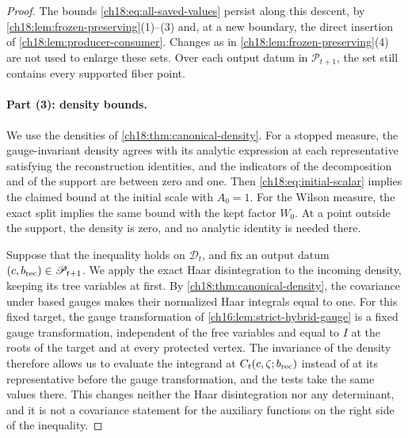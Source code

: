 \begin{proof}
The bounds \eqref{ch18:eq:all-saved-values} persist along this descent, by \cref{ch18:lem:frozen-preserving}(1)--(3) and, at a new boundary, the direct insertion of \cref{ch18:lem:producer-consumer}. Changes as in \cref{ch18:lem:frozen-preserving}(4) are not used to enlarge these sets. Over each output datum in $\mathscr P_{t+1}$, the set still contains every supported fiber point.

\paragraph{Part (3): density bounds.}
We use the densities of \cref{ch18:thm:canonical-density}. For a stopped measure, the gauge-invariant density agrees with its analytic expression at each representative satisfying the reconstruction identities, and the indicators of the decomposition and of the support are between zero and one. Then \eqref{ch18:eq:initial-scalar} implies the claimed bound at the initial scale with $A_0=1$. For the Wilson measure, the exact split implies the same bound with the kept factor $W_0$. At a point outside the support, the density is zero, and no analytic identity is needed there.

Suppose that the inequality holds on $\mathscr D_t$, and fix an output datum $(c,b_{\mathrm{rec}})\in\mathscr P_{t+1}$. We apply the exact Haar disintegration to the incoming density, keeping its tree variables at first. By \cref{ch18:thm:canonical-density}, the covariance under based gauges makes their normalized Haar integrals equal to one. For this fixed target, the gauge transformation of \cref{ch16:lem:strict-hybrid-gauge} is a fixed gauge transformation, independent of the free variables and equal to $I$ at the roots of the target and at every protected vertex. The invariance of the density therefore allows us to evaluate the integrand at $C_t(c,\zeta;b_{\mathrm{rec}})$ instead of at its representative before the gauge transformation, and the tests take the same values there. This changes neither the Haar disintegration nor any determinant, and it is not a covariance statement for the auxiliary functions on the right side of the inequality.


\end{proof}
